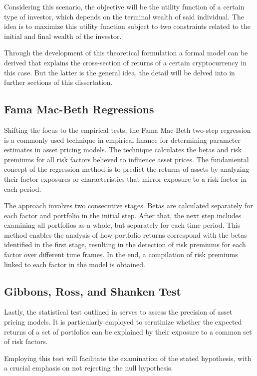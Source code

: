 Considering this scenario, the objective will be the utility function of a certain type of investor, which depends on the terminal wealth of said individual. The idea is to maximize this utility function subject to two constraints related to the initial and final wealth of the investor.

Through the development of this theoretical formulation a formal model can be derived that explains the cross-section of returns of a certain cryptocurrency in this case. But the latter is the general idea, the detail will be delved into in further sections of this dissertation.

\subsection{Fama Mac-Beth Regressions}
Shifting the focus to the empirical tests, the Fama Mac-Beth two-step regression is a commonly used technique in empirical finance for determining parameter estimates in asset pricing models. The technique calculates the betas and risk premiums for all risk factors believed to influence asset prices. The fundamental concept of the regression method is to predict the returns of assets by analyzing their factor exposures or characteristics that mirror exposure to a risk factor in each period.

The approach involves two consecutive stages. Betas are calculated separately for each factor and portfolio in the initial step. After that, the next step includes examining all portfolios as a whole, but separately for each time period. This method enables the analysis of how portfolio returns correspond with the betas identified in the first stage, resulting in the detection of risk premiums for each factor over different time frames. In the end, a compilation of risk premiums linked to each factor in the model is obtained.
\subsection{Gibbons, Ross, and Shanken Test}
Lastly, the statistical test outlined in \parencite{GRS1989} serves to assess the precision of asset pricing models. It is particularly employed to scrutinize whether the expected returns of a set of portfolios can be explained by their exposure to a common set of risk factors. 

Employing this test will facilitate the examination of the stated hypothesis, with a crucial emphasis on not rejecting the null hypothesis.






